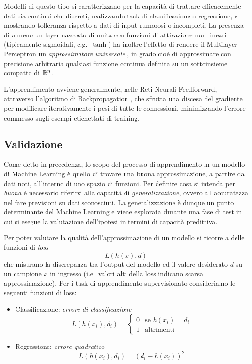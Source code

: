 Modelli di questo tipo si caratterizzano per la capacità di trattare efficacemente dati sia continui che discreti, realizzando task di classificazione o regressione, e mostrando tolleranza rispetto a dati di input rumorosi o incompleti.
La presenza di almeno un layer nascosto di unità con funzioni di attivazione non lineari (tipicamente sigmoidali, e.g.\ $\tanh$) ha inoltre l'effetto di rendere il Multilayer Perceptron un \emph{approssimatore universale} \cite{Cybenko:ApproximationBySuperpositions}, in grado cioè di approssimare con precisione arbitraria qualsiasi funzione continua definita su un sottoinsieme compatto di $\mathbb{R}^n$. 

L'apprendimento avviene generalmente, nelle Reti Neurali Feedforward, attraverso l'algoritmo di Backpropagation \cite{Haykin:NN}, che sfrutta una discesa del gradiente per modificare iterativamente i pesi di tutte le connessioni, minimizzando l'errore commesso sugli esempi etichettati di training. 


\subsection{Validazione}\label{intro:validazione}
Come detto in precedenza, lo scopo del processo di apprendimento in un modello di Machine Learning è quello di trovare una buona approssimazione, a partire da dati noti, all'interno di uno spazio di funzioni. Per definire cosa si intenda per \emph{buona} è necessario riferirsi alla capacità di \emph{generalizzazione}, ovvero all'accuratezza nel fare previsioni su dati sconosciuti.
La generalizzazione è dunque un punto determinante del Machine Learning e viene esplorata durante una fase di test in cui si esegue la valutazione dell'ipotesi in termini di capacità predittiva.

Per poter valutare la qualità dell'approssimazione di un modello si ricorre a delle funzioni di \emph{loss}
\begin{equation}
L(h(x), d) 
\end{equation}
che misurano la discrepanza tra l'output del modello ed il valore desiderato $d$ su un campione $x$ in ingresso (i.e.\ valori alti della loss indicano scarsa approssimazione).
Per i task di apprendimento supervisionato consideriamo le seguenti funzioni di loss:
\begin{itemize}
\item Classificazione: \emph{errore di classificazione}
\begin{equation}
L(h(x_i), d_i) =  
\begin{cases}
0 & \text{se } h(x_i) = d_i \\
1 & \text{altrimenti}
\end{cases}
\end{equation}
\item Regressione: \emph{errore quadratico}
\begin{equation}
L(h(x_i), d_i) =  (d_i - h(x_i))^2
\end{equation}
\end{itemize}

